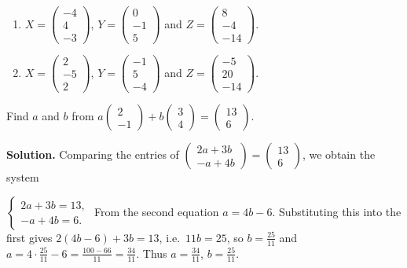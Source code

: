 \begin{enumerate}[label=\arabic*.,  leftmargin=*]
\item $X = \begin{pmatrix} -4 \\ 4 \\ -3 \end{pmatrix}$, $Y = \begin{pmatrix} 0 \\ -1 \\ 5 \end{pmatrix}$ and $Z = \begin{pmatrix} 8 \\ -4 \\ -14 \end{pmatrix}$.
\item $X = \begin{pmatrix} 2 \\ -5 \\ 2 \end{pmatrix}$, $Y = \begin{pmatrix} -1 \\ 5 \\ -4 \end{pmatrix}$ and $Z = \begin{pmatrix} -5 \\ 20 \\ -14 \end{pmatrix}$.
\end{enumerate}
\begin{misol}
Find $a$ and $b$ from $a\begin{pmatrix}2\\-1\end{pmatrix}+b\begin{pmatrix}3\\4\end{pmatrix}=\begin{pmatrix}13\\6\end{pmatrix}$.

\textbf{Solution.} Comparing the entries of $\begin{pmatrix}2a+3b\\-a+4b\end{pmatrix}=\begin{pmatrix}13\\6\end{pmatrix}$, we obtain the system

$\begin{cases}2a+3b=13,\\-a+4b=6.\end{cases}$
From the second equation $a=4b-6$. Substituting this into the first gives
$2(4b-6)+3b=13$, i.e.\ $11b=25$, so $b=\frac{25}{11}$ and
$a=4\cdot\frac{25}{11}-6=\frac{100-66}{11}=\frac{34}{11}$.
Thus $a=\frac{34}{11}$, $b=\frac{25}{11}$.
\end{misol}

